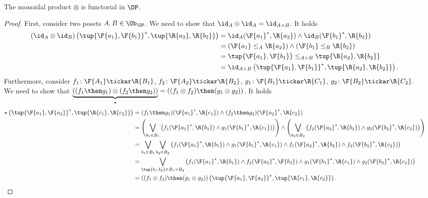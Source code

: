 \begin{lemma}
\label{lemma:monoidal_functorial}
The monoidal product $\otimes$ is functorial in $\DP$.
\end{lemma}
\begin{proof}
First, consider two posets $A,B\in \Ob_\DP$. We need to show that $\id_A\otimes \id_A = \id_{A\times B}$. It holds
\begin{equation}
\begin{aligned}
    \left( \id_{A}\otimes \id_{B}\right)
    \left( \tup{\F{a_1},\F{b_1}}^*,\tup{\R{a_2},\R{b_2}}\right)&=
    \id_A(\F{a_1}^*,\R{a_2})\wedge \id_B(\F{b_1}^*,\R{b_2})\\
    &=\left( \F{a_1}\leq_A \R{a_2}\right)\wedge \left( \F{b_1}\leq_B \R{b_2}\right)\\
    &=\tup{\F{a_1},\F{b_1}}\leq_{A\times B}\tup{\R{a_2},\R{b_2}}\\
    &=\id_{A\times B}\left( \tup{\F{a_1},\F{b_1}}^*,\tup{\R{a_2},\R{b_2}}\right).
\end{aligned}
\end{equation}
Furthermore, consider $f_1\colon \F{A_1} \tickar \R{B_1}$, $f_2\colon \F{A_2}\tickar \R{B_2}$, $g_1\colon \F{B_1}\tickar \R{C_1}$, $g_2\colon \F{B_2}\tickar \R{C_2}$. We need to show that $\underbrace{\left( (f_1\then g_1) \otimes (f_2\then g_2)\right)}_{\star}=\left( (f_1\otimes f_2)\then (g_1\otimes g_2)\right)$. It holds
\begin{equation}
\begin{aligned}
    \star \left( \tup{\F{a_1},\F{a_2}}^*,\tup{\R{c_1},\R{c_2}}\right)&=(f_1\then g_1)(\F{a_1}^*,\R{c_1})\wedge (f_2\then g_2)(\F{a_2}^*,\R{c_2})\\
    &=\left(\bigvee_{b_1\in B_1}\left( f_1(\F{a_1}^*,\R{b_1})\wedge g_1(\F{b_1}^*,\R{c_1})\right)\right) \wedge\left(\bigvee_{b_2\in B_2}\left( f_2(\F{a_2}^*,\R{b_2})\wedge g_2(\F{b_2}^*,\R{c_2})\right)\right)\\
    &=\bigvee_{b_1\in B_1}\bigvee_{b_2\in B_2} \left(f_1(\F{a_1}^*,\R{b_1})\wedge g_1(\F{b_1}^*,\R{c_1})\wedge f_1(\F{a_2}^*,\R{b_2})\wedge f_2(\F{b_2}^*,\R{c_2}) \right)\\
    &=\bigvee_{\tup{b_1,b_2}\in B_1\times B_2} \left(f_1(\F{a_1}^*,\R{b_1})\wedge f_2(\F{a_2}^*,\F{b_2})\wedge g_1(\F{b_1}^*,\R{c_1})\wedge g_2(\F{b_2}^*,\R{c_2}) \right)\\
    &=\left( (f_1\otimes f_2)\then (g_1\otimes g_2)\right)\left(\tup{\F{a_1},\F{a_2}}^*,\tup{\R{c_1},\R{c_2}} \right).
\end{aligned}
\end{equation}
\end{proof}


